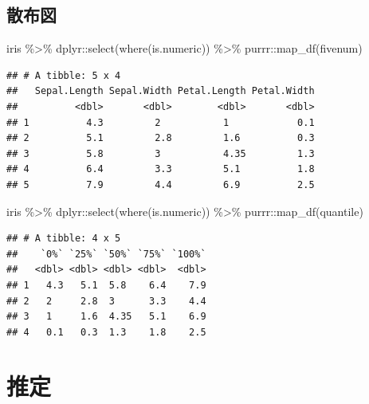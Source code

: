 \documentclass[
  12pt,
]{book}
\newenvironment{Shaded}{\begin{snugshade}}{\end{snugshade}}
\newcommand{\FunctionTok}[1]{\textcolor[rgb]{0.00,0.00,0.00}{#1}}
\newcommand{\NormalTok}[1]{#1}
\newcommand{\SpecialCharTok}[1]{\textcolor[rgb]{0.00,0.00,0.00}{#1}}
\begin{document}
\hypertarget{ux6563ux5e03ux56f3}{%
\subsection{散布図}\label{ux6563ux5e03ux56f3}}

\begin{Shaded}
\begin{Highlighting}[numbers=left,,]
\NormalTok{iris }\SpecialCharTok{\%\textgreater{}\%} 
\NormalTok{  dplyr}\SpecialCharTok{::}\FunctionTok{select}\NormalTok{(}\FunctionTok{where}\NormalTok{(is.numeric)) }\SpecialCharTok{\%\textgreater{}\%} 
\NormalTok{  purrr}\SpecialCharTok{::}\FunctionTok{map\_df}\NormalTok{(fivenum)}
\end{Highlighting}
\end{Shaded}

\begin{verbatim}
## # A tibble: 5 x 4
##   Sepal.Length Sepal.Width Petal.Length Petal.Width
##          <dbl>       <dbl>        <dbl>       <dbl>
## 1          4.3         2           1            0.1
## 2          5.1         2.8         1.6          0.3
## 3          5.8         3           4.35         1.3
## 4          6.4         3.3         5.1          1.8
## 5          7.9         4.4         6.9          2.5
\end{verbatim}

\begin{Shaded}
\begin{Highlighting}[numbers=left,,]
\NormalTok{iris }\SpecialCharTok{\%\textgreater{}\%} 
\NormalTok{  dplyr}\SpecialCharTok{::}\FunctionTok{select}\NormalTok{(}\FunctionTok{where}\NormalTok{(is.numeric)) }\SpecialCharTok{\%\textgreater{}\%} 
\NormalTok{  purrr}\SpecialCharTok{::}\FunctionTok{map\_df}\NormalTok{(quantile)}
\end{Highlighting}
\end{Shaded}

\begin{verbatim}
## # A tibble: 4 x 5
##    `0%` `25%` `50%` `75%` `100%`
##   <dbl> <dbl> <dbl> <dbl>  <dbl>
## 1   4.3   5.1  5.8    6.4    7.9
## 2   2     2.8  3      3.3    4.4
## 3   1     1.6  4.35   5.1    6.9
## 4   0.1   0.3  1.3    1.8    2.5
\end{verbatim}

\hypertarget{ux63a8ux5b9a}{%
\section{推定}\label{ux63a8ux5b9a}}
\end{document}
